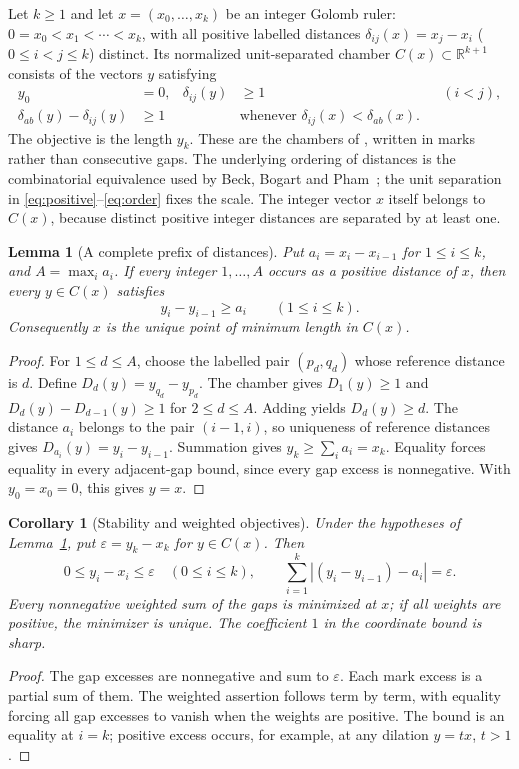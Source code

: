 \documentclass[11pt,a4paper]{article}
\newtheorem{lemma}[theorem]{Lemma}
\newtheorem{corollary}[theorem]{Corollary}
\newcommand{\R}{\mathbb R}
\begin{document}
Let $k\ge1$ and let $x=(x_0,\ldots,x_k)$ be an integer Golomb ruler:
$0=x_0<x_1<\cdots<x_k$, with all positive labelled distances
$\delta_{ij}(x)=x_j-x_i$ ($0\le i<j\le k$) distinct.
Its normalized unit-separated chamber $C(x)\subset\R^{k+1}$ consists of
the vectors $y$ satisfying
\begin{align}
 y_0&=0, & \delta_{ij}(y)&\ge1 &&(i<j),\label{eq:positive}\\
 \delta_{ab}(y)-\delta_{ij}(y)&\ge1
 &&\text{whenever }\delta_{ij}(x)<\delta_{ab}(x).\label{eq:order}
\end{align}
The objective is the length $y_k$. These are the chambers of
\cite[Section~2]{notik}, written in marks rather than consecutive gaps.
The underlying ordering of distances is the combinatorial equivalence
used by Beck, Bogart and Pham~\cite[Section~1]{beck}; the unit separation
in \eqref{eq:positive}--\eqref{eq:order} fixes the scale.
The integer vector $x$ itself belongs to $C(x)$, because distinct positive
integer distances are separated by at least one.

\begin{lemma}[A complete prefix of distances]\label{lem:prefix}
Put $a_i=x_i-x_{i-1}$ for $1\le i\le k$, and
$A=\max_i a_i$. If every integer $1,\ldots,A$ occurs as a positive
distance of $x$, then every $y\in C(x)$ satisfies
\[
 y_i-y_{i-1}\ge a_i\qquad(1\le i\le k).
\]
Consequently $x$ is the unique point of minimum length in $C(x)$.
\end{lemma}
\begin{proof}
For $1\le d\le A$, choose the labelled pair $(p_d,q_d)$ whose
reference distance is $d$. Define
$D_d(y)=y_{q_d}-y_{p_d}$.
The chamber gives $D_1(y)\ge1$ and
$D_d(y)-D_{d-1}(y)\ge1$ for $2\le d\le A$.
Adding yields $D_d(y)\ge d$.
The distance $a_i$ belongs to the pair $(i-1,i)$, so uniqueness of
reference distances gives $D_{a_i}(y)=y_i-y_{i-1}$.
Summation gives $y_k\ge\sum_i a_i=x_k$.
Equality forces equality in every adjacent-gap bound, since every
gap excess is nonnegative. With $y_0=x_0=0$, this gives $y=x$.
\end{proof}

\begin{corollary}[Stability and weighted objectives]\label{cor:stability}
Under the hypotheses of Lemma~\ref{lem:prefix}, put
$\varepsilon=y_k-x_k$ for $y\in C(x)$. Then
\[
 0\le y_i-x_i\le\varepsilon\quad(0\le i\le k),\qquad
 \sum_{i=1}^k\left|(y_i-y_{i-1})-a_i\right|=\varepsilon.
\]
Every nonnegative weighted sum of the gaps is minimized at $x$;
if all weights are positive, the minimizer is unique.
The coefficient $1$ in the coordinate bound is sharp.
\end{corollary}
\begin{proof}
The gap excesses are nonnegative and sum to $\varepsilon$.
Each mark excess is a partial sum of them. The weighted assertion
follows term by term, with equality forcing all gap excesses to vanish
when the weights are positive. The bound is an equality at $i=k$;
positive excess occurs, for example, at any dilation $y=tx$, $t>1$.
\end{proof}
\end{document}
